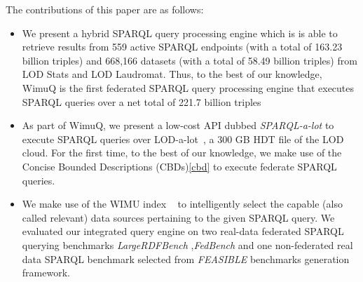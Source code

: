 The contributions of this paper are as follows:
\begin{itemize}
    
    \item We present a hybrid SPARQL query processing engine 
    which is is able to retrieve results from 559 active SPARQL endpoints (with a total of 163.23 billion triples) and 668,166 datasets (with a total of 58.49 billion triples) from LOD Stats and LOD Laudromat. Thus, to the best of our knowledge, WimuQ is the first federated SPARQL query processing engine that executes SPARQL queries over a net total of 221.7 billion triples
    \item As part of WimuQ, we present a low-cost API dubbed \emph{SPARQL-a-lot} to execute SPARQL queries over LOD-a-lot~\cite{fernandez2017lod}, a 300 GB HDT file of the LOD cloud. For the first time, to the best of our knowledge, we make use of the Concise Bounded Descriptions (CBDs)\cref{cbd} to execute federate SPARQL queries.
    \item We make use of the WIMU index ~\cite{valdestilhas2018my} to intelligently select the capable (also called relevant) \cite{hibiscus2014} data sources pertaining to the given SPARQL query. We evaluated our integrated query engine on two real-data federated SPARQL querying benchmarks \emph{LargeRDFBench} \cite{largerdfbench2017},\emph{FedBench} \cite{fedbench2011} and one non-federated real data SPARQL benchmark selected from \emph{FEASIBLE} \cite{feasible2015} benchmarks generation framework. 
    
    
    
    

\end{itemize}
